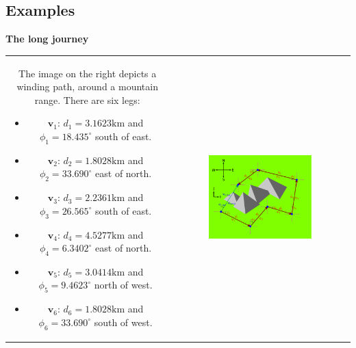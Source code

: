 \documentclass{article}
\begin{document}
\subsection*{Examples}

\textbf{The long journey}

\begin{tabular}{cc}
\parbox{0.4\textwidth}{
The image on the right depicts a winding path, around a mountain range. There are six legs: 
\begin{itemize}
\item \(\mathbf{v}_1\): \(d_1 = 3.1623\text{km}\) and \(\phi_1 = 18.435^\circ\) south of east.
\item \(\mathbf{v}_2\): \(d_2 = 1.8028\text{km}\) and \(\phi_2 = 33.690^\circ\) east of north.
\item \(\mathbf{v}_3\): \(d_3 = 2.2361\text{km}\) and \(\phi_3 = 26.565^\circ\) south of east.
\item \(\mathbf{v}_4\): \(d_4 = 4.5277\text{km}\) and \(\phi_4 = 6.3402^\circ\) east of north.
\item \(\mathbf{v}_5\): \(d_5 = 3.0414\text{km}\) and \(\phi_5 = 9.4623^\circ\) north of west.
\item \(\mathbf{v}_6\): \(d_6 = 1.8028\text{km}\) and \(\phi_6 = 33.690^\circ\) south of west.
\end{itemize}
} & \parbox{0.6\textwidth}{
\includegraphics[width = 0.6\textwidth]{long_journey}
}
\end{tabular}
\end{document}
